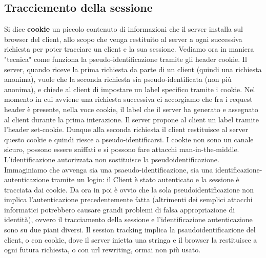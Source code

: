 \subsection{Tracciemento della sessione}
Si dice \textbf{cookie} un piccolo contenuto di informazioni che il server installa sul browser del client, allo scopo che venga restituito al server a ogni successiva richiesta per poter tracciare un client e la sua sessione.\newline
\newline
Vediamo ora in maniera "tecnica" come funziona la pseudo-identificazione tramite gli header cookie. Il server, quando riceve la prima richiesta da parte di un client (quindi una richiesta anonima), vuole che la seconda richiesta sia pseudo-identificata (non più anonima), e chiede al client di impostare un label specifico tramite i cookie. Nel momento in cui avviene una richiesta successiva ci accorgiamo che fra i request header è presente, nella voce cookie, il label che il server ha generato e assegnato al client durante la prima interazione.\newline
\newline
Il server propone al client un label tramite l'header set-cookie. Dunque alla seconda richiesta il client restituisce al server questo cookie e quindi riesce a pseudo-identificarsi.\newline
\newline
I cookie non sono un canale sicuro, possono essere sniffati e si possono fare attacchi man-in-the-middle.\newline
\newline
L'identificazione autorizzata non sostituisce la pseudoidentificazione. Immaginiamo che avvenga sia una psaeudo-identificazione, sia una identificazione-autenticazione tramite un login: il Client è stato autenticato e la sessione è tracciata dai cookie. Da ora in poi è ovvio che la sola pseudoidentificazione non implica l'autenticazione precedentemente fatta (altrimenti dei semplici attacchi informatici potrebbero causare grandi problemi di falsa appropriazione di identità), ovvero il tracciamento della sessione e l'identificazione autenticazione sono su due piani diversi.\newline
\newline
Il session tracking implica la psaudoidentificazione del client, o con cookie, dove il server inietta una stringa e il browser la restituisce a ogni futura richiesta, o con url rewriting, ormai non più usato.\newline
\newline
